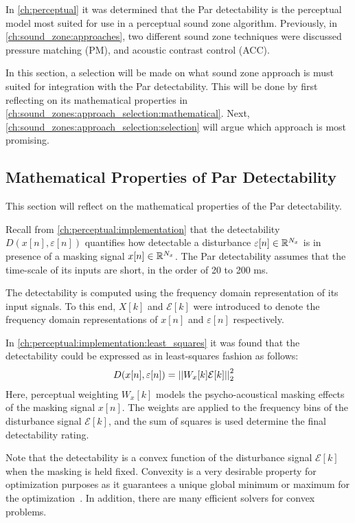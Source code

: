 In \autoref{ch:perceptual} it was determined that the Par detectability is the perceptual model most suited for use in a 
perceptual sound zone algorithm.
Previously, in \autoref{ch:sound_zone:approaches}, two different sound zone techniques were discussed 
pressure matching (PM), and acoustic contrast control (ACC). 

In this section, a selection will be made on what sound zone approach is must suited for integration with the Par
detectability.
This will be done by first reflecting on its mathematical properties in \autoref{ch:sound_zones:approach_selection:mathematical}.
Next, \autoref{ch:sound_zones:approach_selection:selection} will argue which approach is most promising.

\subsection{Mathematical Properties of Par Detectability}
\label{ch:sound_zones:approach_selection:mathematical}
This section will reflect on the mathematical properties of the Par detectability.

Recall from \autoref{ch:perceptual:implementation} that the detectability $D(x[n],\varepsilon[n])$ quantifies how detectable a disturbance
$\varepsilon[n]\in\mathbb{R}^{N_x}$ is in presence of a masking signal $x[n]\in\mathbb{R}^{N_x}$.
The Par detectability assumes that the time-scale of its inputs are short, in the order of 20 to 200 ms.

The detectability is computed using the frequency domain representation of its input signals.
To this end, $X[k]$ and $\mathcal{E}[k]$ were introduced to denote the frequency domain representations of $x[n]$ and $\varepsilon[n]$ respectively.

In \autoref{ch:perceptual:implementation:least_squares} it was found that the detectability could be expressed as in least-squares fashion as follows:
\begin{align}
    D(x[n],\varepsilon[n]) &= \norm[2][2]{W_x[k]\mathcal{E}[k]} 
    \label{eq:perceptual:approach_selection:detectability}
\end{align}
Here, perceptual weighting $W_x[k]$ models the psycho-acoustical masking effects of the masking signal $x[n]$.
The weights are applied to the frequency bins of the disturbance signal $\mathcal{E}[k]$, and the sum of squares is used determine the final detectability rating.

Note that the detectability is a convex function of the disturbance signal $\mathcal{E}[k]$ when the masking is held fixed. 
Convexity is a very desirable property for optimization purposes as it guarantees a unique global minimum or maximum for the optimization~\cite{boyd2004convex}.
In addition, there are many efficient solvers for convex problems.

